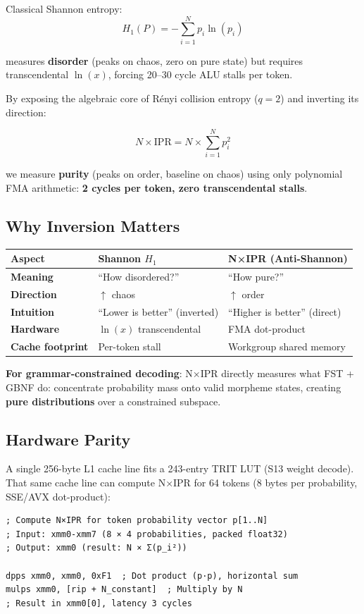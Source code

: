 \documentclass[11pt,oneside]{article}
\begin{document}
Classical Shannon entropy:
\[H_1(P) = -\sum_{i=1}^{N} p_i \ln(p_i)\]

measures \textbf{disorder} (peaks on chaos, zero on pure state) but requires transcendental $\ln(x)$, forcing 20--30 cycle ALU stalls per token.

By exposing the algebraic core of Rényi collision entropy ($q=2$) and inverting its direction:

\[N \times \text{IPR} = N \times \sum_{i=1}^{N} p_i^2\]

we measure \textbf{purity} (peaks on order, baseline on chaos) using only polynomial FMA arithmetic: \textbf{2 cycles per token, zero transcendental stalls}.

\subsection{Why Inversion Matters}

\begin{center}
\begin{tabular}{lll}
\toprule
Aspect & Shannon $H_1$ & N×IPR (Anti-Shannon) \\
\midrule
\textbf{Meaning} & ``How disordered?'' & ``How pure?'' \\
\textbf{Direction} & $\uparrow$ chaos & $\uparrow$ order \\
\textbf{Intuition} & ``Lower is better'' (inverted) & ``Higher is better'' (direct) \\
\textbf{Hardware} & $\ln(x)$ transcendental & FMA dot-product \\
\textbf{Cache footprint} & Per-token stall & Workgroup shared memory \\
\bottomrule
\end{tabular}
\end{center}

\textbf{For grammar-constrained decoding}: N×IPR directly measures what FST + GBNF do: concentrate probability mass onto valid morpheme states, creating \textbf{pure distributions} over a constrained subspace.

\subsection{Hardware Parity}

A single 256-byte L1 cache line fits a 243-entry TRIT LUT (S13 weight decode). That same cache line can compute N×IPR for 64 tokens (8 bytes per probability, SSE/AVX dot-product):

\begin{lstlisting}
; Compute N×IPR for token probability vector p[1..N]
; Input: xmm0-xmm7 (8 × 4 probabilities, packed float32)
; Output: xmm0 (result: N × Σ(p_i²))

dpps xmm0, xmm0, 0xF1  ; Dot product (p·p), horizontal sum
mulps xmm0, [rip + N_constant]  ; Multiply by N
; Result in xmm0[0], latency 3 cycles
\end{lstlisting}
\end{document}
